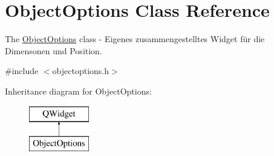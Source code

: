 \hypertarget{class_object_options}{}\section{Object\+Options Class Reference}
\label{class_object_options}


The \hyperlink{class_object_options}{Object\+Options} class -\/ Eigenes zusammengestelltes Widget für die Dimensonen und Position.  




{\ttfamily \#include $<$objectoptions.\+h$>$}

Inheritance diagram for Object\+Options\+:\begin{figure}[H]
\begin{center}
\leavevmode
\includegraphics[height=2.000000cm]{class_object_options}
\end{center}
\end{figure}
